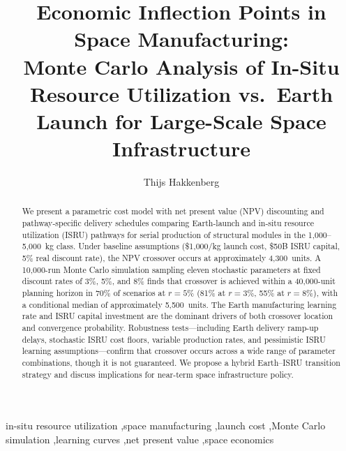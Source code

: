 \documentclass[preprint,12pt]{elsarticle}
\begin{document}
\begin{frontmatter}

\title{Economic Inflection Points in Space Manufacturing:\\ Monte Carlo Analysis of In-Situ Resource Utilization vs.\ Earth Launch for Large-Scale Space Infrastructure}

\author[dyson]{Thijs Hakkenberg}

\address[dyson]{Project Dyson, Open Research Initiative}

\begin{abstract}
We present a parametric cost model with net present value (NPV) discounting and pathway-specific delivery schedules comparing Earth-launch and in-situ resource utilization (ISRU) pathways for serial production of structural modules in the 1{,}000--5{,}000~kg class. Under baseline assumptions (\$1{,}000/kg launch cost, \$50B ISRU capital, 5\% real discount rate), the NPV crossover occurs at approximately 4{,}300~units. A 10{,}000-run Monte Carlo simulation sampling eleven stochastic parameters at fixed discount rates of 3\%, 5\%, and 8\% finds that crossover is achieved within a 40{,}000-unit planning horizon in 70\% of scenarios at $r = 5\%$ (81\% at $r = 3\%$, 55\% at $r = 8\%$), with a conditional median of approximately 5{,}500~units. The Earth manufacturing learning rate and ISRU capital investment are the dominant drivers of both crossover location and convergence probability. Robustness tests---including Earth delivery ramp-up delays, stochastic ISRU cost floors, variable production rates, and pessimistic ISRU learning assumptions---confirm that crossover occurs across a wide range of parameter combinations, though it is not guaranteed. We propose a hybrid Earth--ISRU transition strategy and discuss implications for near-term space infrastructure policy.
\end{abstract}

\begin{keyword}
in-situ resource utilization \sep space manufacturing \sep launch cost \sep Monte Carlo simulation \sep learning curves \sep net present value \sep space economics
\end{keyword}

\end{frontmatter}
\end{document}

